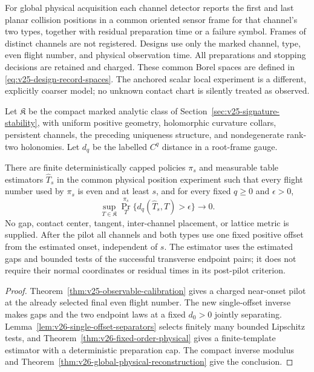 For global physical acquisition each channel detector reports the first and
last planar collision positions in a common oriented sensor frame for that
channel's two types, together with residual preparation time or a failure
symbol.  Frames of distinct channels are not registered.  Designs use only
the marked channel, type, even flight number, and physical observation time.
All preparations and stopping decisions are retained and charged.  These
common Borel spaces are defined in \eqref{eq:v25-design-record-spaces}.
The anchored scalar local experiment is a different, explicitly coarser
model; no unknown contact chart is silently treated as observed.

Let \(\mathfrak K\) be the compact marked analytic class of
Section~\ref{sec:v25-signature-stability}, with uniform positive geometry,
holomorphic curvature collars, persistent channels, the preceding uniqueness
structure, and nondegenerate rank-two holonomies.  Let \(d_q\) be the
labelled \(C^q\) distance in a root-frame gauge.

\begin{theorem}
\label{thm:v26-intro-physical}
\label{thm:v25-intro-physical}
There are finite deterministically capped policies \(\pi_s\) and measurable
table estimators \(\widehat T_s\) in the common physical position experiment
such that every flight number used by \(\pi_s\) is even and at least
\(s\), and for every fixed \(q\ge0\) and \(\epsilon>0\),
\[
 \sup_{T\in\mathfrak K}\Pr_T^{\pi_s}
       \{d_q(\widehat T_s,T)>\epsilon\}\longrightarrow0.
\]
No gap, contact center, tangent, inter-channel placement, or lattice metric
is supplied.  After the pilot all channels and both types use one fixed
positive offset from the estimated onset, independent of \(s\).  The
estimator uses the estimated gaps and bounded tests of the successful
transverse endpoint pairs; it does not require their normal coordinates
or residual times in its post-pilot criterion.
\end{theorem}

\begin{proof}
Theorem~\ref{thm:v25-observable-calibration} gives a charged near-onset
pilot at the already selected final even flight number.  The new
single-offset inverse makes gaps and the two endpoint laws at a fixed
\(d_0>0\) jointly separating.  Lemma~\ref{lem:v26-single-offset-separators}
selects finitely many bounded Lipschitz tests, and
Theorem~\ref{thm:v26-fixed-order-physical} gives a finite-template estimator
with a deterministic preparation cap.  The compact inverse modulus and
Theorem~\ref{thm:v26-global-physical-reconstruction} give the conclusion.
\end{proof}

